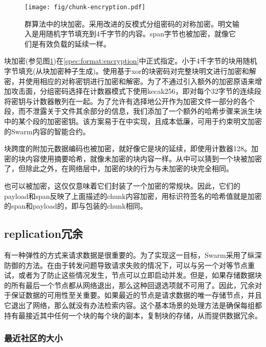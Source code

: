 \begin{figure}[htbp]
    \centering
    \texttt{[image: fig/chunk-encryption.pdf]}
    \caption[群中的块加密\statusgreen]{群算法中的块加密。采用改进的反模式分组密码的对称加密。明文输入是用随机字节填充到4千字节的内容。span字节也被加密，就像它们是有效负载的延续一样。}
    \label{fig:chunk-encryption}
\end{figure}


块加密(参见图\ref{fig:chunk-encryption})在\ref{spec:format:encryption}中正式指定。小于4千字节的块用随机字节填充(从块加密种子生成)。使用基于xor的块密码对完整块明文进行加密和解密，并使用相应的对称密钥进行加密和解密。为了不通过引入额外的加密原语来增加攻击面，分组密码选择在计数器模式下使用kecak256，即对每个32字节的连续段将密钥与计数器散列在一起。为了允许有选择地公开作为加密文件一部分的各个段，而不泄露关于文件其余部分的信息，我们添加了一个额外的哈希步骤来派生块中的某个段的加密密钥。该方案易于在中实现，且成本低廉，可用于约束明文加密的Swarm内容的智能合约。

块跨度的附加元数据编码也被加密，就好像它是块的延续，即使用计数器128。加密的块内容使用摘要哈希，就像未加密的块内容一样。从中可以猜到一个块被加密了，但除此之外，在网络层中，加密的块的行为与未加密的块完全相同。

也可以被加密，这仅仅意味着它们封装了一个加密的常规块。因此，它们的payload和span反映了上面描述的chunk内容加密，用标识符签名的哈希值就是加密的span和payload的，即与包装的chunk相同。

\subsection{replication冗余\statusgreen}\label{sec:redundancy-by-local-replication}

有一种弹性的方式来请求数据是很重要的。为了实现这一目标，Swarm采用了纵深防御的方法。在由于转发问题导致请求失败的情况下，可以与另一个对等节点重试，或者为了防止这些情况发生，节点可以立即启动并发。但是，如果存储数据块的所有最后一个节点都从网络退出，那么这种回退选项就不可用了。因此，冗余对于保证数据的可用性至关重要。如果最近的节点是请求数据的唯一存储节点，并且它退出了网络，那么就没有办法检索内容。这个基本场景的处理方法是确保每组都持有最接近其中任何一个块的每个块的副本，复制块的存储，从而提供数据冗余。 

\subsubsection{最近社区的大小}

